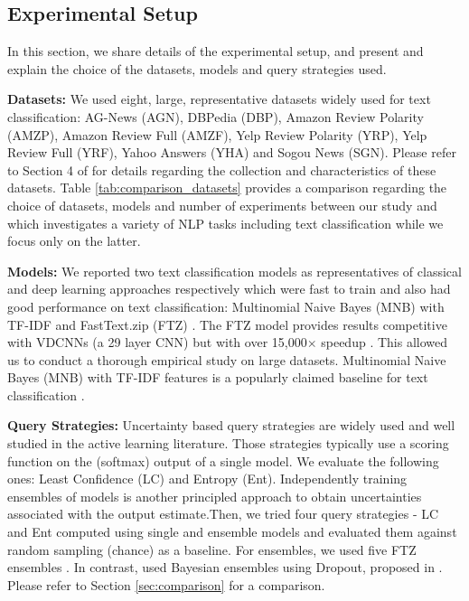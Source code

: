 \documentclass[11pt,a4paper]{article}
\begin{document}
\subsection{Experimental Setup}

In this section, we share details of the experimental setup, and present and explain the choice of the datasets, models and query strategies used. 

\textbf{Datasets:} We used eight, large, representative datasets widely used for text classification: AG-News (AGN), DBPedia (DBP), Amazon Review Polarity (AMZP), Amazon Review Full (AMZF), Yelp Review Polarity (YRP), Yelp Review Full (YRF), Yahoo Answers (YHA) and Sogou News (SGN). Please refer to Section 4 of \cite{zhang2015character} for details regarding the collection and characteristics of these datasets. Table \ref{tab:comparison_datasets} provides a comparison regarding the choice of datasets, models and number of experiments between our study and \cite{siddhant2018deep} which investigates a variety of NLP tasks including text classification while we focus only on the latter.

\textbf{Models:} We reported two text classification models as representatives of classical and deep learning approaches respectively which were fast to train and also had good performance on text classification:  Multinomial Naive Bayes (MNB) with TF-IDF \cite{wang2012baselines} and FastText.zip (FTZ) \cite{joulin2016fasttext}. The FTZ model provides results competitive with VDCNNs (a 29 layer CNN) \cite{conneau2016very} but with over 15,000$\times$ speedup \cite{joulin2016bag}.  
This allowed us to conduct a thorough empirical study on large datasets. Multinomial Naive Bayes (MNB) with TF-IDF features is a popularly claimed baseline for text classification \cite{wang2012baselines}.



\textbf{Query Strategies:} Uncertainty based query strategies are widely used and well studied in the active learning literature. Those strategies typically use a scoring function on the (softmax) output of a single model. We evaluate the following ones: Least Confidence (LC) and Entropy (Ent). Independently training ensembles of models \cite{lakshminarayanan2017simple} is another principled approach to obtain uncertainties associated with the output estimate.Then, we tried four query strategies - LC and Ent computed using single and ensemble models and evaluated them against random sampling (chance) as a baseline. For ensembles, we used five FTZ ensembles \cite{lakshminarayanan2017simple}. In contrast, \cite{siddhant2018deep} used  Bayesian ensembles using Dropout, proposed in \cite{gal2017deep}. Please refer to Section \ref{sec:comparison} for a comparison.   
\end{document}
